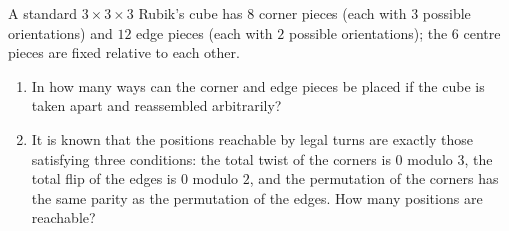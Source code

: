 A standard $3\times3\times3$ Rubik's cube has $8$ corner pieces (each with $3$ possible orientations) and $12$ edge pieces (each with $2$ possible orientations); the $6$ centre pieces are fixed relative to each other.
\begin{enumerate}
\item[(a)] In how many ways can the corner and edge pieces be placed if the cube is taken apart and reassembled arbitrarily?
\item[(b)] It is known that the positions reachable by legal turns are exactly those satisfying three conditions: the total twist of the corners is $0$ modulo $3$, the total flip of the edges is $0$ modulo $2$, and the permutation of the corners has the same parity as the permutation of the edges. How many positions are reachable?
\end{enumerate}
